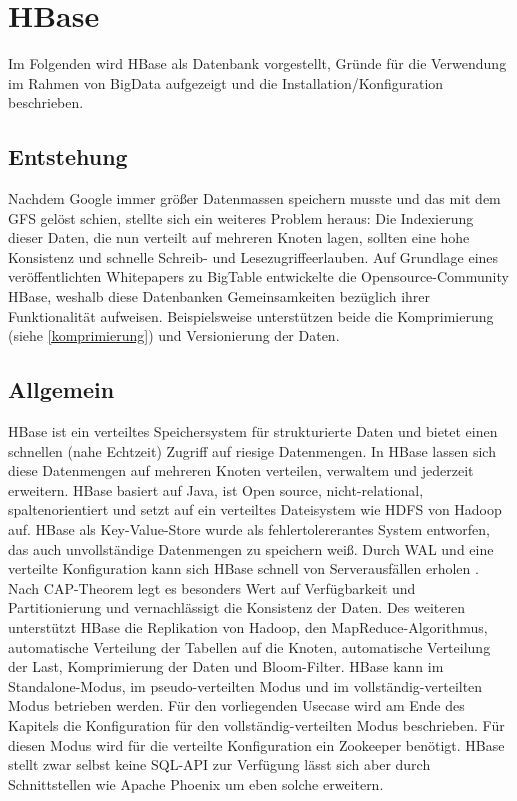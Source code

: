 \section{HBase}



Im Folgenden wird HBase als Datenbank vorgestellt, Gründe  für die Verwendung im Rahmen von BigData aufgezeigt und die Installation/Konfiguration beschrieben.

\subsection{Entstehung}
Nachdem Google immer größer Datenmassen speichern musste und das mit dem  \ac{GFS} gelöst schien, stellte sich ein weiteres Problem heraus: Die Indexierung dieser Daten, die nun verteilt auf mehreren Knoten lagen, sollten eine hohe Konsistenz und schnelle Schreib- und Lesezugriffeerlauben. Auf Grundlage eines veröffentlichten Whitepapers zu BigTable \cite{bigtable} entwickelte die Opensource-Community HBase, weshalb diese Datenbanken Gemeinsamkeiten bezüglich ihrer Funktionalität aufweisen. Beispielsweise unterstützen beide die Komprimierung (siehe \ref{komprimierung}) und Versionierung der Daten.

\subsection{Allgemein}
HBase ist ein verteiltes Speichersystem für strukturierte Daten und bietet einen schnellen (nahe Echtzeit) Zugriff auf riesige Datenmengen. In HBase lassen sich diese Datenmengen auf mehreren Knoten verteilen, verwaltem und jederzeit erweitern. HBase basiert auf Java, ist Open source, nicht-relational, spaltenorientiert und setzt auf ein verteiltes Dateisystem wie HDFS von Hadoop auf. HBase als Key-Value-Store wurde als fehlertolererantes System entworfen, das auch unvollständige Datenmengen zu speichern weiß. Durch \ac{WAL} und eine verteilte Konfiguration kann sich HBase schnell von Serverausfällen erholen \cite{Redt01}. Nach CAP-Theorem legt es besonders Wert auf Verfügbarkeit und Partitionierung und vernachlässigt die Konsistenz der Daten. Des weiteren unterstützt HBase die Replikation von Hadoop, den MapReduce-Algorithmus, automatische Verteilung der Tabellen auf die Knoten, automatische Verteilung der Last, Komprimierung der Daten und Bloom-Filter. HBase kann im Standalone-Modus, im pseudo-verteilten Modus und im vollständig-verteilten Modus betrieben werden. Für den vorliegenden Usecase wird am Ende des Kapitels die Konfiguration für den vollständig-verteilten Modus beschrieben. Für diesen Modus wird für die verteilte Konfiguration ein Zookeeper benötigt. HBase stellt zwar selbst keine SQL-API zur Verfügung lässt sich aber durch Schnittstellen wie Apache Phoenix um eben solche erweitern.


